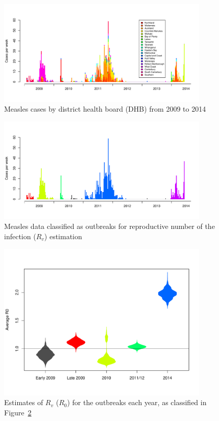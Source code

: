 \documentclass{article}
\begin{document}
\begin{figure}
     \centering
     \includegraphics[width=0.9\textwidth]{cases_by_dhb_2009_2014.pdf}
     \caption{Measles cases by district health board (DHB) from 2009 to 2014}
     \label{fig:dhbcases}
\end{figure}

\begin{figure}
     \centering
     \includegraphics[width=0.9\textwidth]{outbreaks_for_R0.pdf}
     \caption{Measles data classified as outbreaks for reproductive number of the infection ($R_v$) estimation}
     \label{fig:outbreaks}
\end{figure}

\begin{figure}
     \centering
     \includegraphics[width=0.9\textwidth]{averageR0.pdf}
     \caption{Estimates of $R_v$ ($R_0$) for the outbreaks each year, as classified in Figure~\ref{fig:outbreaks}}
     \label{fig:r0}
\end{figure}
\end{document}
